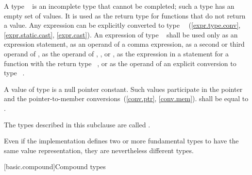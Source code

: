 \pnum
{}%
A type \cv{}~
is an incomplete type that cannot be completed; such a type has
an empty set of values. It is used as the return
type for functions that do not return a value. Any expression can be
explicitly converted to type \cv{}~~(\ref{expr.type.conv},
\ref{expr.static.cast}, \ref{expr.cast}).
An expression of type \cv{}~ shall
be used only as an expression statement, as an operand
of a comma expression, as a second or third operand
of , as the operand of
, , or , as
the expression in a  statement for a function
with the return type \cv{}~, or as the operand of an explicit conversion
to type \cv{}~.

\pnum
A value of type  is a null pointer
constant. Such values participate in the pointer and the
pointer-to-member conversions~(\ref{conv.ptr}, \ref{conv.mem}).
 shall be equal to .

\pnum
{}%
The types described in this subclause
are called .
\begin{note}
Even if the implementation defines two or more fundamental types to have the
same value representation, they are nevertheless different types.
\end{note}

[basic.compound]{Compound types}

